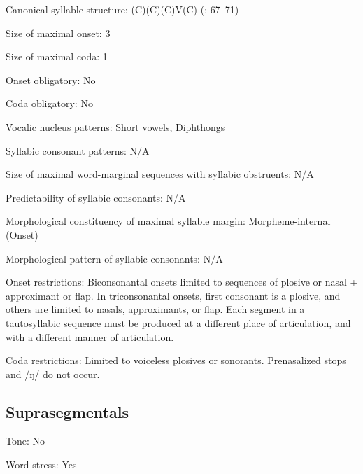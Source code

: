 {\begin{appendixdesc}
\item[Canonical syllable structure:] (C)(C)(C)V(C) (\citealt{CunhadeOliveira2005}: 67--71)

\item[Size of maximal onset:] 3

\item[Size of maximal coda:] 1

\item[Onset obligatory:] No

\item[Coda obligatory:] No

\item[Vocalic nucleus patterns:] Short vowels, Diphthongs

\item[Syllabic consonant patterns:] N/A

\item[Size of maximal word-marginal sequences with syllabic obstruents:] N/A

\item[Predictability of syllabic consonants:] N/A 

\item[Morphological constituency of maximal syllable margin:] Morpheme-internal (Onset)

\item[Morphological pattern of syllabic consonants:] N/A

\item[Onset restrictions:] Biconsonantal onsets limited to sequences of plosive or nasal + approximant or flap. In triconsonantal onsets, first consonant is a plosive, and others are limited to nasals, approximants, or flap. Each segment in a tautosyllabic sequence must be produced at a different place of articulation, and with a different manner of articulation.

\item[Coda restrictions:] Limited to voiceless plosives or sonorants. Prenasalized stops and /ŋ/ do not occur.
\end{appendixdesc}
\subsection*{Suprasegmentals}
\begin{appendixdesc}

\item[Tone:] No

\item[Word stress:] Yes


\end{appendixdesc}}
